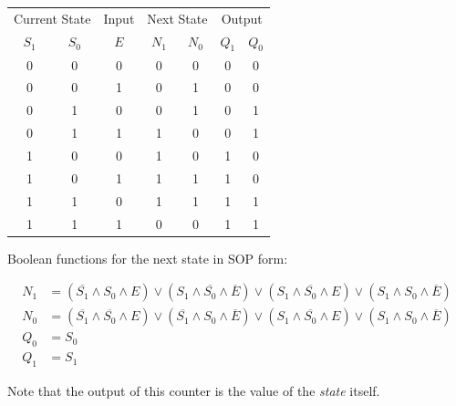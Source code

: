 \documentclass[10pt,letterpaper]{article}
\begin{document}
\begin{center}
\begin{tabular}{|cc|c||cc|cc|}
\hline
\multicolumn{2}{|c|}{Current State} &  Input & \multicolumn{2}{|c|}{Next State} & \multicolumn{2}{|c|}{Output} \\
$S_1$ & $S_0$ & $E$ & $N_1$ & $N_0$ & $Q_1$ & $Q_0$ \\
\hline
\hline
0 & 0 & 0 & 0 & 0 &  0 & 0\\
0 & 0 & 1 & 0 & 1 &  0 & 0\\
0 & 1 & 0 & 0 & 1 &  0 & 1\\
0 & 1 & 1 & 1 & 0 &  0 & 1\\
1 & 0 & 0 & 1 & 0 &  1 & 0\\
1 & 0 & 1 & 1 & 1 &  1 & 0\\
1 & 1 & 0 & 1 & 1 &  1 & 1\\
1 & 1 & 1 & 0 & 0 &  1 & 1\\
\hline
\end{tabular}
\end{center}

Boolean functions for the next state in SOP form:

\begin{align}
N_1	& = (\overline{S_1} \land S_0 \land E) \lor
		(S_1 \land \overline{S_0} \land \overline{E}) \lor
		(S_1 \land \overline{S_0} \land E) \lor
		(S_1 \land S_0 \land \overline{E}) \\
N_0	& = (\overline{S_1} \land \overline{S_0} \land E) \lor
		(\overline{S_1} \land S_0 \land \overline{E}) \lor
		(S_1 \land \overline{S_0} \land E) \lor
		(S_1 \land S_0 \land \overline{E})\\
Q_0 & = S_0\\
Q_1 & = S_1
\end{align}

Note that the output of this counter is the value of the {\em state} itself.

%
%
\end{document}
